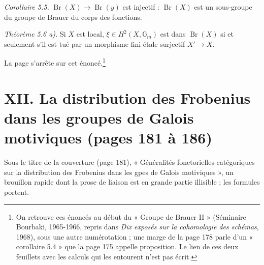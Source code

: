 \documentclass[11pt,a4paper]{article}
\begin{document}
\emph{Corollaire 5.5.} $\operatorname{Br}(X) \to \operatorname{Br}(y)$ est
injectif : $\operatorname{Br}(X)$ est un sous-groupe du groupe de Brauer du corps
des fonctions.

\emph{Théorème 5.6 a).} Si $X$ est local, $\xi \in H^{2}(X, \mathbb{G}_{m})$ est
dans $\operatorname{Br}(X)$ si et seulement s'il est tué par un morphisme fini
étale surjectif $X' \to X$.

La page s'arrête sur cet énoncé.\footnote{On retrouve ces énoncés au début du
« Groupe de Brauer II » (Séminaire Bourbaki, 1965-1966, repris dans \emph{Dix
exposés sur la cohomologie des schémas}, 1968), sous une autre numérotation ; une
marge de la page 178 parle d'un « corollaire 5.4 » que la page 175 appelle
proposition. Le lien de ces deux feuillets avec les calculs qui les entourent
n'est pas écrit.}

\section*{XII. La distribution des Frobenius dans les groupes de Galois motiviques (pages 181 à 186)}

Sous le titre de la couverture (page 181), « Généralités
fonctorielles-catégoriques sur la distribution des Frobenius dans les gpes de
Galois motiviques », un brouillon rapide dont la prose de liaison est en grande
partie illisible ; les formules portent.
\end{document}
